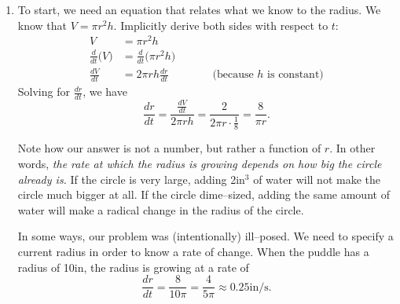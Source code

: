 {\begin{enumerate}
\drawexampleline
\item		To start, we need an equation that relates what we know to the radius.
We know that $V=\pi r^2h$.  Implicitly derive both sides with respect to $t$:
\begin{align*}
 V &= \pi r^2 h \\
 \frac{d}{dt}\big(V\big) &= \frac{d}{dt}\big(\pi r^2 h\big) \\
 \frac{dV}{dt} &= 2\pi r h \frac{dr}{dt} \qquad\qquad\text{(because $h$ is constant)}
\end{align*}
Solving for $\frac{dr}{dt}$, we have
\[
\frac{dr}{dt}=\frac{\frac{dV}{dt}}{2\pi r h}=\frac{2}{2\pi r\cdot\frac18}=\frac8{\pi r}.
\]
%
%

Note how our answer is not a number, but rather a function of $r$. In other words, \textit{the rate at which the radius is growing depends on how big the circle already is.} If the circle is very large, adding 2in$^3$ of water will not make the circle much bigger at all. If the circle dime--sized, adding the same amount of water will make a radical change in the radius of the circle.

In some ways, our problem was (intentionally) ill--posed. We need to specify a current radius in order to know a rate of change. When the puddle has a radius of 10in, the radius is growing at a rate of $$
\frac{dr}{dt} = \frac{8}{10\pi} = \frac{4}{5\pi} \approx 0.25\text{in/s}.$$
 
\end{enumerate}
\baselineskip
}\\

